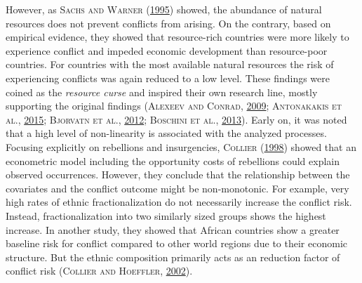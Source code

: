 \documentclass[a4paper,11pt]{article}
\begin{document}
However, as \textsc{\textnormal{Sachs} and \textnormal{Warner}} \textsc{(\textnormal{\protect\hyperlink{ref-sachs1995}{1995}})} showed, the abundance of natural resources does not
prevent conflicts from arising. On the contrary, based on empirical evidence, they
showed that resource-rich countries were more likely to experience
conflict and impeded economic development than resource-poor countries.
For countries with the most available natural resources the
risk of experiencing conflicts was again reduced to a low level. These findings were
coined as the \emph{resource curse} and inspired their own research line, mostly
supporting the original findings \textsc{(\textnormal{\textsc{Alexeev} and \textsc{Conrad}}, \textnormal{\protect\hyperlink{ref-alexeev2009}{2009}}; \textnormal{\textsc{Antonakakis} \textsc{et al.}}, \textnormal{\protect\hyperlink{ref-antonakakis2015}{2015}}; \textnormal{\textsc{Bjorvatn} \textsc{et al.}}, \textnormal{\protect\hyperlink{ref-bjorvatn2012}{2012}}; \textnormal{\textsc{Boschini} \textsc{et al.}}, \textnormal{\protect\hyperlink{ref-boschini2013}{2013}})}.
Early on, it was noted that a high level of non-linearity is associated with the
analyzed processes. Focusing explicitly on rebellions and
insurgencies, \textsc{\textnormal{Collier}} \textsc{(\textnormal{\protect\hyperlink{ref-collier1998}{1998}})} showed that an econometric model including the opportunity
costs of rebellions could explain observed occurrences. However, they
conclude that the relationship between the covariates and the conflict outcome
might be non-monotonic. For example, very high rates of ethnic fractionalization
do not necessarily increase the conflict risk. Instead, fractionalization into
two similarly sized groups shows the highest increase. In another study, they showed
that African countries show a greater baseline risk for conflict compared to other
world regions due to their economic structure. But the ethnic composition primarily
acts as an reduction factor of conflict risk \textsc{(\textnormal{\textsc{Collier} and \textsc{Hoeffler}}, \textnormal{\protect\hyperlink{ref-collier2002}{2002}})}.
\end{document}
